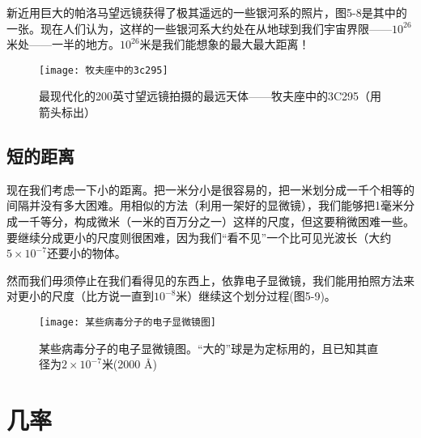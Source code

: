 \documentclass[11pt,oneside]{book}
\begin{document}
\begin{common-format}
新近用巨大的帕洛马望远镜获得了极其遥远的一些银河系的照片，图5-8是其中的一张。现在人们认为，这样的一些银河系大约处在从地球到我们宇宙界限——$ 10^{26} $米处——一半的地方。$ 10^{26} $米是我们能想象的最大最大距离！
\begin{figure}[H]
\centering
\texttt{[image: 牧夫座中的3c295]}
\caption{\footnotesize 最现代化的200英寸望远镜拍摄的最远天体——牧夫座中的3C295（用箭头标出）}
\end{figure}


\section{短的距离}
现在我们考虑一下小的距离。把一米分小是很容易的，把一米划分成一千个相等的间隔并没有多大困难。用相似的方法（利用一架好的显微镜），我们能够把1毫米分成一千等分，构成微米（一米的百万分之一）这样的尺度，但这要稍微困难一些。要继续分成更小的尺度则很困难，因为我们“看不见”一个比可见光波长（大约$ 5\times 10^{-7} $还要小的物体。

然而我们毋须停止在我们看得见的东西上，依靠电子显微镜，我们能用拍照方法来对更小的尺度（比方说一直到$ 10^{-8} $米）继续这个划分过程(图5-9)。
\begin{figure}[H]
\centering
\texttt{[image: 某些病毒分子的电子显微镜图]}
\caption{\footnotesize 某些病毒分子的电子显微镜图。“大的”球是为定标用的，且已知其直径为$ 2\times 10^{-7} $米(2000 Å)}
\end{figure}




\chapter{几率}




\end{common-format}
\end{document}
